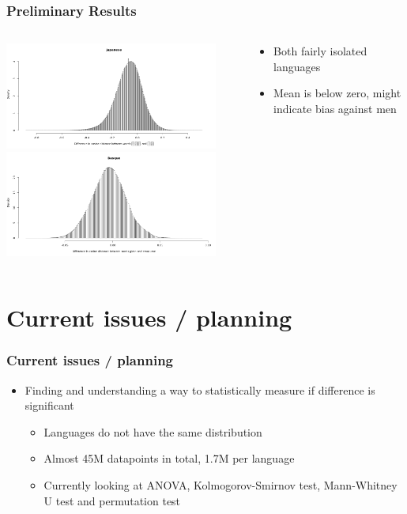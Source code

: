 \documentclass[handout]{beamer}
\begin{document}
\begin{frame}
    \frametitle{Preliminary Results}
    \begin{columns}[T]
        \begin{column}{6cm}
            \includegraphics[width=7cm]{images/ja_hist.png}
            \includegraphics[width=7cm]{images/eu_hist.png}
        \end{column}
        \begin{column}{6cm}
            \begin{itemize}
                \item Both fairly isolated languages
                \item Mean is below zero, might indicate bias against men
            \end{itemize}
        \end{column}
    \end{columns}
\end{frame}

\section{Current issues / planning}
\begin{frame}
    \frametitle{Current issues / planning}
    \begin{itemize}
        \item Finding and understanding a way to statistically measure if difference 
            is significant
            \begin{itemize}
                \item Languages do not have the same distribution
                \item Almost 45M datapoints in total, 1.7M per language
                \item Currently looking at ANOVA, Kolmogorov-Smirnov test, Mann-Whitney U test and permutation test 
            \end{itemize}
    \end{itemize}
\end{frame}

\end{document}
